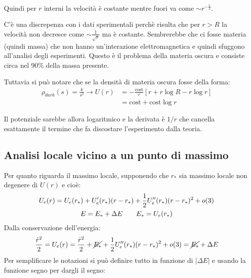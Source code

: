 \documentclass[Main.tex]{subfiles}
\begin{document}
\begin{tema}
\

Quindi per $r$ interni la velocità è costante mentre fuori va come $\sim r^{-\frac{1}{2}}$.

C'è una discrepenza con i dati sperimentali perchè risulta che per $r>R$ la velocità non decresce come $\sim \frac{1}{\sqrt{r}}$ ma è costante. Sembrerebbe che ci fosse materia (quindi massa) che non hanno un'interazione elettromagnetica e quindi sfuggono all'analisi degli esperimenti. Questo è il problema della materia oscura e consiste circa nel 90\% della massa presente. 

 Tuttavia si può notare che se la densità di materia oscura fosse della forma:
\begin{align*}
	\rho_{dark}(s) = \frac{k}{s^2} \rightarrow U(r) &= - \frac{ \text{cost}}{r} \left[ r+ r \log R - r\log r \right] \\ &=  \text{cost} + \text{cost} \log r
\end{align*}

Il potenziale sarebbe allora logaritmico e la derivata è $1/r$ che cancella esattamente il termine che fa discostare l'esperimento dalla teoria.
\end{tema}



\newpage
\subsection{Analisi locale vicino a un punto di massimo}
Per quanto riguarda il massimo locale, supponendo che $r_*$ sia massimo locale non degenere di $U(r)$ e cioè:
\begin{gather} \notag
	U_e(r) = U_e(r_*) + U'_e(r_*)(r-r_*) + \frac{1}{2} U_e''(r_*)(r-r_*)^2+o(3)\\
	E=E_* + \Delta E \ \ \ \ \ \ E_*=U_e(r_*)
\end{gather}
Dalla conservazione dell'energia:
\begin{equation}
	\frac{\dot r^2}{2} = U_e(r) = \frac{\dot r^2}{2} + \cancel{E_*} + \frac{1}{2} U_e'' (r_*)(r-r_*)^2 + o(3) = \cancel{E_*} + \Delta E
\end{equation}
Per semplificare le notazioni si può definire tutto in funzione di $|\Delta E|$ e usando la funzione segno per dargli il segno:
\end{document}
